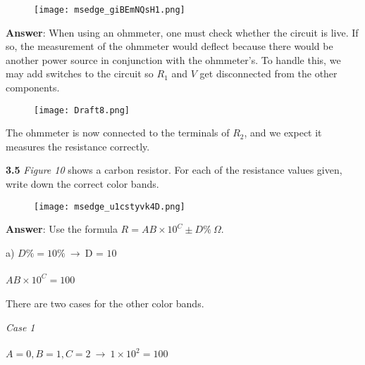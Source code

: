 \documentclass{article}
\begin{document}
\begin{figure}[H]
    \centering
    \texttt{[image: msedge\_giBEmNQsH1.png]}
\end{figure}

{\Large \textbf{Answer}: When using an ohmmeter, one must check whether the circuit is live. If so, the measurement of the ohmmeter would deflect because there would be another power source in conjunction with the ohmmeter's. To handle this, we may add switches to the circuit so $R_1$ and $V$ get disconnected from the other components.}

\begin{figure}[H]
    \centering
    \texttt{[image: Draft8.png]}
\end{figure}

{\Large The ohmmeter is now connected to the terminals of $R_2$, and we expect it measures the resistance correctly.}

\vspace{8mm}

\newpage

{\Large \textbf{3.5} \textit{Figure 10} shows a carbon resistor. For each of the resistance values given, write down the correct color bands.}

\begin{figure}[H]
    \centering
    \texttt{[image: msedge\_u1cstyvk4D.png]}
\end{figure}

{\Large {}}

{\vspace{4mm}}

{\Large \textbf{Answer}: Use the formula $R = AB \times 10^{C} \pm D\% \  \Omega$.}

{\vspace{4mm}}

{\Large a) $D\% = 10\% \ \rightarrow \ \boxed{\text{D = 10}}$ \\\\ $AB \times 10^{C} = 100$ \\\\ There are two cases for the other color bands.}

{\vspace{4mm}}

{\Large \textit{Case 1} \\\\ $\boxed{A = 0, B = 1, C = 2} \ \rightarrow \ 1 \times 10^{2} = 100$}
\end{document}
